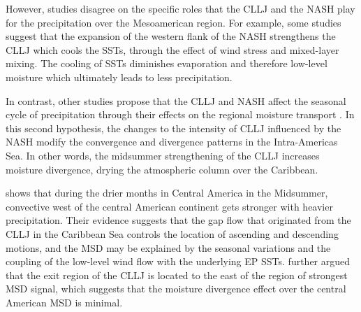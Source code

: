  
 
 However, studies disagree on the specific roles that the CLLJ and the NASH play for the precipitation over the Mesoamerican region. 
 For example, some studies \citep[e.g.][]{giannini2000,mestas2007,gamble2008} suggest that  the expansion of the western flank of the NASH strengthens the CLLJ which cools the SSTs, through the effect of wind stress and mixed-layer mixing.
The cooling of SSTs diminishes evaporation and therefore low-level moisture which ultimately leads to less precipitation. 

In contrast, other studies propose that the CLLJ and NASH affect the seasonal cycle of precipitation through their effects on the regional moisture transport \citep{small2007,munoz2008,herrera2015,duranquesada2017,martinez2019}. In this second hypothesis, the changes to the intensity of CLLJ influenced by the NASH modify the convergence and divergence patterns in the Intra-Americas Sea. In other words, the midsummer strengthening of the CLLJ increases moisture divergence, drying the atmospheric column over the Caribbean. 


 
    


    
 \cite{herrera2015} shows that during the drier months in Central America in the Midsummer, convective west of the central American continent gets stronger with heavier precipitation.  Their evidence suggests that the gap flow that originated from the CLLJ in the Caribbean Sea controls the location of ascending and descending motions, and the MSD may be explained by the seasonal variations and the coupling of the low-level wind flow with the underlying EP SSTs.
\cite{herrera2015} further argued that the exit region of the CLLJ is located to the east of the region of strongest MSD signal, which suggests that the moisture divergence effect over the central American MSD is minimal. 



